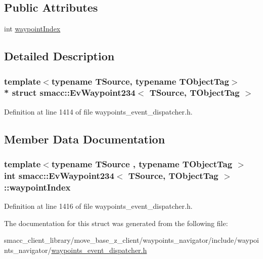 \subsection*{Public Attributes}
\begin{DoxyCompactItemize}
\item 
int \hyperlink{structsmacc_1_1EvWaypoint234_a12a6f87218e76c98b97907e354d8cede}{waypoint\+Index}
\end{DoxyCompactItemize}


\subsection{Detailed Description}
\subsubsection*{template$<$typename T\+Source, typename T\+Object\+Tag$>$\\*
struct smacc\+::\+Ev\+Waypoint234$<$ T\+Source, T\+Object\+Tag $>$}



Definition at line 1414 of file waypoints\+\_\+event\+\_\+dispatcher.\+h.



\subsection{Member Data Documentation}
\subsubsection[{\texorpdfstring{waypoint\+Index}{waypointIndex}}]{\setlength{\rightskip}{0pt plus 5cm}template$<$typename T\+Source , typename T\+Object\+Tag $>$ int {\bf smacc\+::\+Ev\+Waypoint234}$<$ T\+Source, T\+Object\+Tag $>$\+::waypoint\+Index}\hypertarget{structsmacc_1_1EvWaypoint234_a12a6f87218e76c98b97907e354d8cede}{}\label{structsmacc_1_1EvWaypoint234_a12a6f87218e76c98b97907e354d8cede}


Definition at line 1416 of file waypoints\+\_\+event\+\_\+dispatcher.\+h.



The documentation for this struct was generated from the following file\+:\begin{DoxyCompactItemize}
\item 
smacc\+\_\+client\+\_\+library/move\+\_\+base\+\_\+z\+\_\+client/waypoints\+\_\+navigator/include/waypoints\+\_\+navigator/\hyperlink{waypoints__event__dispatcher_8h}{waypoints\+\_\+event\+\_\+dispatcher.\+h}\end{DoxyCompactItemize}
